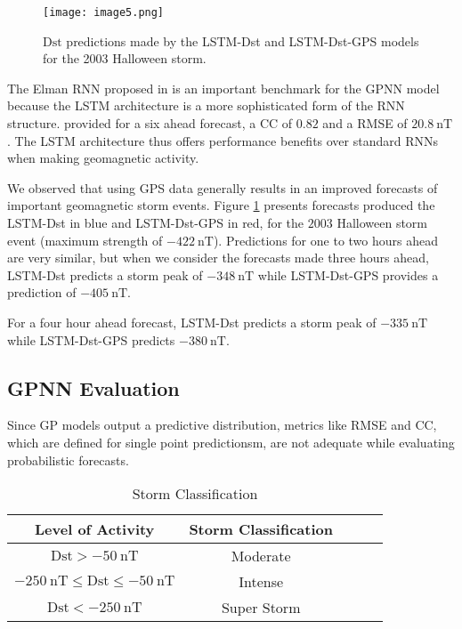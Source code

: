 \begin{figure}
	\texttt{[image: image5.png]}
	\caption{$\mathrm{Dst}$ predictions made by the LSTM-Dst and LSTM-Dst-GPS models for the 2003 Halloween storm.}
    \label{fig:lstmhalloween}
\end{figure}


The Elman RNN proposed in \citet{wu1997geomagnetic} is an important benchmark for the GPNN model because the 
LSTM architecture is a more sophisticated form of the RNN structure. \citet{wu1997geomagnetic} provided for a 
six ahead forecast, a CC of $0.82$ and a RMSE of $\SI{20.8}{\nano\tesla}$. The LSTM architecture thus offers 
performance benefits over standard RNNs when making geomagnetic activity.
 
We observed that using GPS data generally results in an improved forecasts of important geomagnetic storm events. 
Figure \ref{fig:lstmhalloween} presents forecasts produced the LSTM-Dst in blue and LSTM-Dst-GPS in red, 
for the $2003$ Halloween storm event (maximum strength of $\SI{-422}{\nano\tesla}$). Predictions for one to two hours 
ahead are very similar, but when we consider the forecasts made three hours ahead, LSTM-Dst predicts a storm peak 
of $\SI{-348}{\nano\tesla}$ while LSTM-Dst-GPS provides a prediction of $\SI{-405}{\nano\tesla}$. 

For a four hour ahead forecast, LSTM-Dst predicts a storm peak of $\SI{-335}{\nano\tesla}$ while LSTM-Dst-GPS predicts 
$\SI{-380}{\nano\tesla}$.



\subsection{GPNN Evaluation}

Since GP models output a predictive distribution, metrics like RMSE and CC, which are defined for single point 
predictionsm, are not adequate while evaluating probabilistic forecasts.

\begin{table}[h]
	\centering
	\caption{Storm Classification}
	\label{table:stormclass}
	\begin{tabular}{ccccc}
	\hline
	\textbf{Level of Activity} & \textbf{Storm Classification} \\ \hline
	$\mathrm{Dst} > \SI{-50}{\nano\tesla}$ & Moderate\\
	$\SI{-250}{\nano\tesla} \leq \mathrm{Dst} \leq \SI{-50}{\nano\tesla}$ & Intense\\
	$\mathrm{Dst} < \SI{-250}{\nano\tesla}$ & Super Storm\\ \hline
	\end{tabular}
\end{table}

